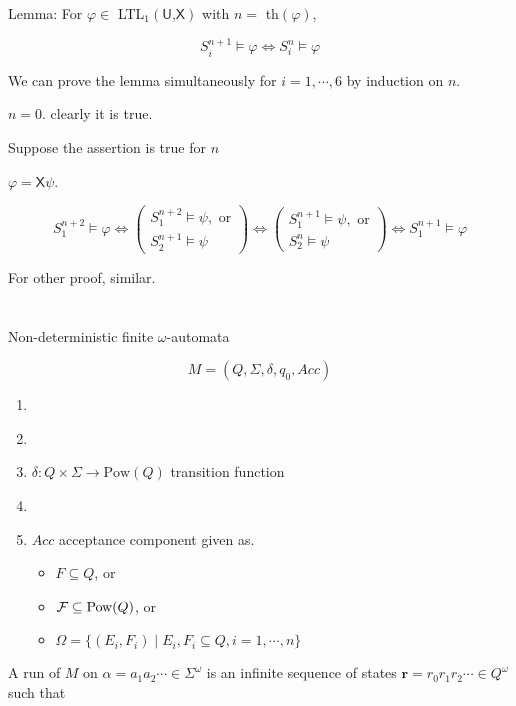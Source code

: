 \documentclass[12pt]{article}
\begin{document}
Lemma: For $\varphi\in $ LTL$_1(\textsf{U,X})$ with $n=$ th$(\varphi)$,

$$S^{n+1}_i\models \varphi \Longleftrightarrow S_i^n\models\varphi$$


We can prove the lemma simultaneously for $i=1,\cdots,6$ by induction on $n$. 

$n=0$. clearly it is true.

Suppose the assertion is true for $n$

$\varphi=\textsf{X}\psi$. 

$$S_1^{n+2}\models \varphi\Longleftrightarrow \left( 
\begin{array}{l}
S_1^{n+2}\models \psi, \mbox{ or}\\
S_2^{n+1}\models \psi
\end{array}
\right)\Longleftrightarrow \left(\begin{array}{l}
S_1^{n+1}\models \psi, \mbox{ or}\\
S_2^{n}\models \psi
\end{array}
\right)\Longleftrightarrow S_1^{n+1}\models \varphi$$ 

For other proof, similar.\\



\ \\ \ \\

Non-deterministic finite $\omega$-automata

$$M=(Q,\Sigma,\delta,q_0, Acc)$$


\begin{enumerate}
\item \ 
\item \ 
\item $\delta:Q\times\Sigma\rightarrow\mbox{Pow}(Q)$ transition function
\item \ 
\item $Acc$ acceptance component given as.
\begin{itemize}
\item $F\subseteq Q$, or
\item ${\cal F}\subseteq\mbox{Pow}(Q)$, or 
\item $\Omega=\{(E_i,F_i)\mid E_i, F_i\subseteq Q, i=1,\cdots,n\}$ 
\end{itemize}
\end{enumerate}

A run of $M$ on $\alpha=a_1a_2\cdots\in\Sigma^{\omega}$ is an infinite sequence of states $\mathbf{r}=r_0r_1r_2\cdots\in Q^{\omega}$ such that
\end{document}
